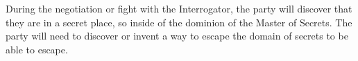 During the negotiation or fight with the Interrogator, the party will discover that they are in a secret place, so inside of the dominion of the Master of Secrets.
The party will need to discover or invent a way to escape the domain of secrets to be able to escape.
